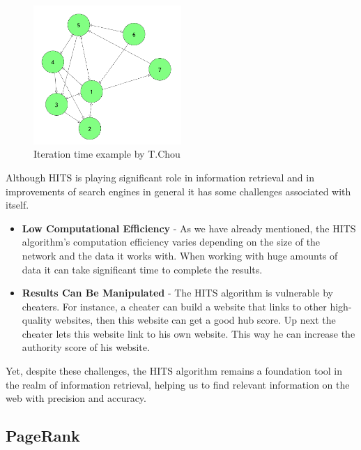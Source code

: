 \documentclass[10pt,english,a4paper]{article}
\begin{document}
\begin{figure}
  \centering
  \includegraphics[width=0.5\textwidth]{comp_time_1.png}
  \caption{Iteration time example by T.Chou\cite{hits_article}}
  \label{comp_time}
\end{figure}

Although HITS is playing significant role in information retrieval and in improvements of search engines in general it has some challenges associated with itself.
\begin{itemize}
  \item \textbf{Low Computational Efficiency} - As we have already mentioned, the HITS algorithm's computation efficiency varies depending on the size of the network and the data it works with. When working with huge amounts of data it can take significant time to complete the results.
  \item \textbf{Results Can Be Manipulated} - The HITS algorithm is vulnerable by cheaters. For instance, a cheater can build a website that links to other high-quality websites, then this website can get a good hub score. Up next the cheater lets this website link to his own website. This way he can increase the authority score of his website.  
\end{itemize}
Yet, despite these challenges, the HITS algorithm remains a foundation tool in the realm of information retrieval, helping us to find relevant information on the web with precision and accuracy.\cite{challenges_article}
\subsection{PageRank}\label{pagerank}
 

\end{document}
